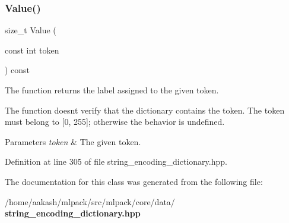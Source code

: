 \mbox{\label{classmlpack_1_1data_1_1StringEncodingDictionary_3_01int_01_4_acb38a53633e0d476f90c5e18db7b2525}} 
\subsubsection{Value()}
{\footnotesize\ttfamily size\+\_\+t Value (\begin{DoxyParamCaption}\item[{const int}]{token }\end{DoxyParamCaption}) const\hspace{0.3cm}{\ttfamily [inline]}}



The function returns the label assigned to the given token. 

The function doesn\textquotesingle{}t verify that the dictionary contains the token. The token must belong to [0, 255]; otherwise the behavior is undefined.


\begin{DoxyParams}{Parameters}
{\em token} & The given token. \\
\hline
\end{DoxyParams}


Definition at line 305 of file string\+\_\+encoding\+\_\+dictionary.\+hpp.



The documentation for this class was generated from the following file\+:\begin{DoxyCompactItemize}
\item 
/home/aakash/mlpack/src/mlpack/core/data/\textbf{ string\+\_\+encoding\+\_\+dictionary.\+hpp}\end{DoxyCompactItemize}
